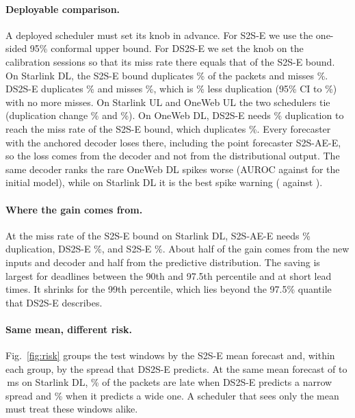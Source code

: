 \paragraph{Deployable comparison.} A deployed scheduler must set its knob in advance. For S2S-E we use the one-sided 95\% conformal upper bound. For DS2S-E we set the knob on the calibration sessions so that its miss rate there equals that of the S2S-E bound. On Starlink DL, the S2S-E bound duplicates \SchedSSdupSLDL\% of the packets and misses \SchedSSmissSLDL\%. DS2S-E duplicates \SchedDSdupSLDL\% and misses \SchedDSmissSLDL\%, which is \SchedSaveSLDL\% less duplication (95\% CI \SchedSaveSLDLlo{} to \SchedSaveSLDLhi\%) with no more misses. On Starlink UL and OneWeb UL the two schedulers tie (duplication change \SchedSaveSLUL\% and \SchedSaveOWUL\%). On OneWeb DL, DS2S-E needs \SchedDSdupCurveOWDL\% duplication to reach the miss rate of the S2S-E bound, which duplicates \SchedSSdupOWDL\%. Every forecaster with the anchored decoder loses there, including the point forecaster S2S-AE-E, so the loss comes from the decoder and not from the distributional output. The same decoder ranks the rare OneWeb DL spikes worse (AUROC \AUCFROWDL{} against \AUCPrevOWDL{} for the initial model), while on Starlink DL it is the best spike warning (\AUCFRSLDL{} against \AUCPrevSLDL).

\paragraph{Where the gain comes from.} At the miss rate of the S2S-E bound on Starlink DL, S2S-AE-E needs \SchedFFdupSLDL\% duplication, DS2S-E \SchedDSdupCurveSLDL\%, and S2S-E \SchedSSdupCurveSLDL\%. About half of the gain comes from the new inputs and decoder and half from the predictive distribution. \GaussSchedSentence{} The saving is largest for deadlines between the 90th and 97.5th percentile and at short lead times. It shrinks for the 99th percentile, which lies beyond the 97.5\% quantile that DS2S-E describes.

\paragraph{Same mean, different risk.} Fig.~\ref{fig:risk} groups the test windows by the S2S-E mean forecast and, within each group, by the spread that DS2S-E predicts. At the same mean forecast of \RiskMeanLo{} to \RiskMeanHi\,ms on Starlink DL, \RiskLowPct\% of the packets are late when DS2S-E predicts a narrow spread and \RiskHighPct\% when it predicts a wide one. A scheduler that sees only the mean must treat these windows alike.

